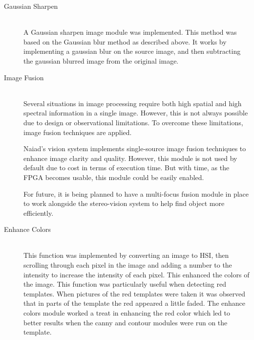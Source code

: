 \begin{description}
\item[Gaussian Sharpen]\hfill \\
A Gaussian sharpen image module was implemented. This method was based on the Gaussian blur method as described above. It works by implementing a gaussian blur on the source image, and then subtracting the gaussian blurred image from the original image. 

\item[Image Fusion]\hfill \\
Several situations in image processing require both high spatial and high spectral information in a single image. However, this is not always possible due to design or observational limitations.
To overcome these limitations, image fusion techniques are applied.

Naiad's vision system implements single-source image fusion techniques to enhance image clarity and quality. However, this module is not used by default due to cost in terms of execution time. But with time, as the FPGA becomes usable, this module could be easily enabled.

For future, it is being planned to have a multi-focus fusion module in place to work alongside the stereo-vision system to help find object more efficiently. 
\cite{article:Zheng2010} \cite{article:Zhang2010} \cite{article:Shutao}

\item[Enhance Colors]\hfill \\
This function was implemented by converting an image to HSI, then scrolling through each pixel in the image and adding a number to the intensity to increase the intensity of each pixel. This enhanced the colors of the image. This function was particularly useful when detecting red templates. When pictures of the red templates were taken it was observed that in parts of the template the red appeared a little faded. The enhance colors module worked a treat in enhancing the red color which led to better results when the canny and contour modules were run on the template. 
\end{description}

